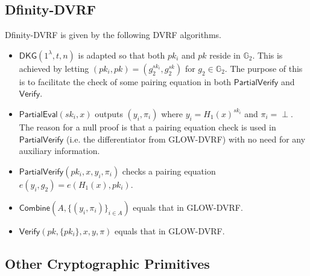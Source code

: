 \documentclass[conference]{IEEEtran}
\theoremstyle{definition}
\theoremstyle{remark}
\begin{document}
\subsection{Dfinity-DVRF}
\label{appendix:dfinity-dvrf}
Dfinity-DVRF is given by the following DVRF algorithms.
\begin{itemize}
\item $\mathsf{DKG}(1^\lambda, t, n)$ is adapted so that both $pk_i$ and $pk$ reside in $\mathbb{G}_2$. This is achieved by letting $(pk_i, pk) = (g_2^{sk_i}, g_2^{sk})$ for $g_2 \in \mathbb{G}_2$. The purpose of this is to facilitate the check of some pairing equation in both $\mathsf{PartialVerify}$ and $\mathsf{Verify}$.
\item $\mathsf{PartialEval}(sk_i, x)$ outputs $(y_i, \pi_i)$ where $y_i = H_1(x)^{sk_i}$ and $\pi_i = \text{$\perp$}$. The reason for a null proof is that a pairing equation check is used in $\mathsf{PartialVerify}$ (i.e. the differentiator from GLOW-DVRF) with no need for any auxiliary information.
\item $\mathsf{PartialVerify}(pk_i, x, y_i, \pi_i)$ checks a pairing equation $e(y_i, g_2) = e(H_1(x), pk_i)$.
\item $\mathsf{Combine}(A, \{(y_i, \pi_i)\}_{i \in A})$ equals that in GLOW-DVRF.
\item $\mathsf{Verify}(pk, \{pk_i\}, x, y, \pi)$ equals that in GLOW-DVRF.
\end{itemize}

\subsection{Other Cryptographic Primitives}
\end{document}
